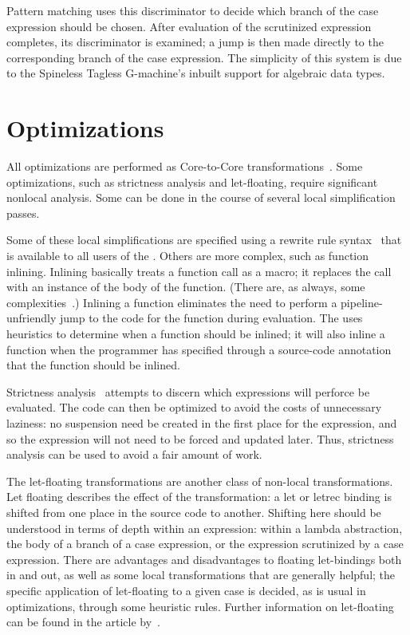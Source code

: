Pattern matching uses this discriminator to decide which branch of the case expression should be chosen. After evaluation of the scrutinized expression completes, its discriminator is examined; a jump is then made directly to the corresponding branch of the case expression. The simplicity of this system is due to the Spineless Tagless G-machine's inbuilt support for algebraic data types.

\section{Optimizations}
All optimizations are performed as Core-to-Core transformations~\citep{Peyton-Jones:A-transformation-based:1998}. Some optimizations, such as strictness analysis and let-floating, require significant nonlocal analysis. Some can be done in the course of several local simplification passes.

Some of these local simplifications are specified using a rewrite rule syntax~\citep{Peyton-Jones:Playing:2001} that is available to all users of the \GHC[long]{}. Others are more complex, such as function inlining. Inlining basically treats a function call as a macro; it replaces the call with an instance of the body of the function. (There are, as always, some complexities~\citep{Peyton-Jones:Secrets:2002}.) Inlining a function eliminates the need to perform a pipeline-unfriendly jump to the code for the function during evaluation. The \GHC[long] uses heuristics to determine when a function should be inlined; it will also inline a function when the programmer has specified through a source-code annotation that the function should be inlined.

Strictness analysis~\citep{Peyton-Jones:Measuring:1993} attempts to discern which expressions will perforce be evaluated. The code can then be optimized to avoid the costs of unnecessary laziness: no suspension need be created in the first place for the expression, and so the expression will not need to be forced and updated later. Thus, strictness analysis can be used to avoid a fair amount of work.

The let-floating transformations are another class of non-local transformations. Let floating describes the effect of the transformation: a let or letrec binding is shifted from one place in the source code to another. Shifting here should be understood in terms of depth within an expression: within a lambda abstraction, the body of a branch of a case expression, or the expression scrutinized by a case expression. There are advantages and disadvantages to floating let-bindings both in and out, as well as some local transformations that are generally helpful; the specific application of let-floating to a given case is decided, as is usual in optimizations, through some heuristic rules. Further information on let-floating can be found in the article by~\citet{Peyton-Jones:Let-floating:1996}.

